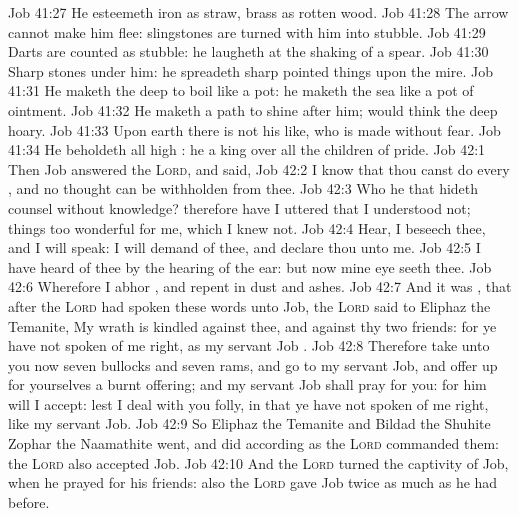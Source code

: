 \vs Job 41:27 He esteemeth iron as straw,  brass as rotten wood.
\vs Job 41:28 The arrow cannot make him flee: slingstones are turned with him into stubble.
\vs Job 41:29 Darts are counted as stubble: he laugheth at the shaking of a spear.
\vs Job 41:30 Sharp stones  under him: he spreadeth sharp pointed things upon the mire.
\vs Job 41:31 He maketh the deep to boil like a pot: he maketh the sea like a pot of ointment.
\vs Job 41:32 He maketh a path to shine after him;  would think the deep  hoary.
\vs Job 41:33 Upon earth there is not his like, who is made without fear.
\vs Job 41:34 He beholdeth all high : he  a king over all the children of pride.
\vs Job 42:1 Then Job answered the \textsc{Lord}, and said,
\vs Job 42:2 I know that thou canst do every , and  no thought can be withholden from thee.
\vs Job 42:3 Who  he that hideth counsel without knowledge? therefore have I uttered that I understood not; things too wonderful for me, which I knew not.
\vs Job 42:4 Hear, I beseech thee, and I will speak: I will demand of thee, and declare thou unto me.
\vs Job 42:5 I have heard of thee by the hearing of the ear: but now mine eye seeth thee.
\vs Job 42:6 Wherefore I abhor , and repent in dust and ashes.
\vs Job 42:7 And it was , that after the \textsc{Lord} had spoken these words unto Job, the \textsc{Lord} said to Eliphaz the Temanite, My wrath is kindled against thee, and against thy two friends: for ye have not spoken of me  right, as my servant Job .
\vs Job 42:8 Therefore take unto you now seven bullocks and seven rams, and go to my servant Job, and offer up for yourselves a burnt offering; and my servant Job shall pray for you: for him will I accept: lest I deal with you  folly, in that ye have not spoken of me  right, like my servant Job.
\vs Job 42:9 So Eliphaz the Temanite and Bildad the Shuhite  Zophar the Naamathite went, and did according as the \textsc{Lord} commanded them: the \textsc{Lord} also accepted Job.
\vs Job 42:10 And the \textsc{Lord} turned the captivity of Job, when he prayed for his friends: also the \textsc{Lord} gave Job twice as much as he had before.
